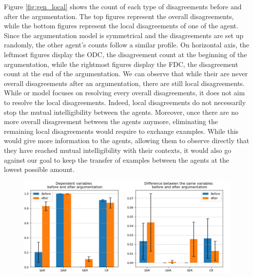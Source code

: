 Figure \ref{fig:gen_local} shows the count of each type of disagreements before and after the argumentation. The top figures represent the overall disagreements, while the bottom figures represent the local disagreements of one of the agent. Since the argumentation model is symmetrical and the disagreements are set up randomly, the other agent's counts follow a similar profile. On horizontal axis, the leftmost figures display the ODC, the disagreement count at the beginning of the argumentation, while the rightmost figures display the FDC, the disagreement count at the end of the argumentation. We can observe that while their are never overall disagreements after an argumentation, there are still local disagreements. While or model focuses on resolving every overall disagreements, it does not aim to resolve the local disagreements. Indeed, local disagreements do not necessarily stop the mutual intelligibility between the agents. Moreover, once there are no more overall disagreement between the agents anymore, eliminating the remaining local disagreements would require to exchange examples. While this would give more information to the agents, allowing them to observe directly that they have reached mutual intelligibility with their contexts, it would also go against our goal to keep the transfer of examples between the agents at the lowest possible amount.

\begin{figure}
    \centering
    \includegraphics[width=\textwidth]{results/Figure_1_resized.png}
    \caption{}
    \label{fig:gen_intro}
\end{figure}

